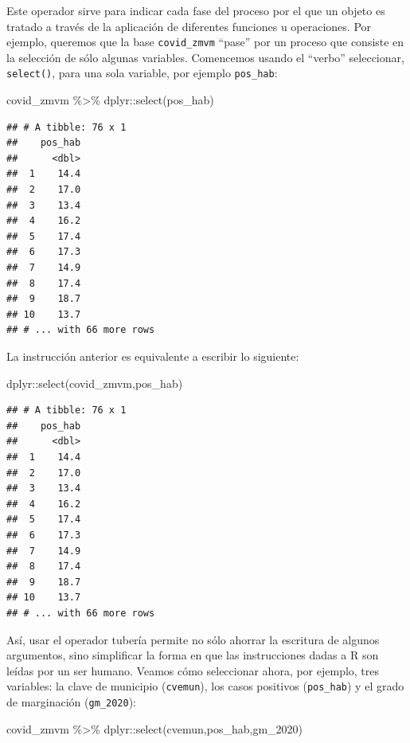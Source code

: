 \documentclass[
  11pt,
  oneside]{book}
\newenvironment{Shaded}{\begin{snugshade}}{\end{snugshade}}
\newcommand{\FunctionTok}[1]{\textcolor[rgb]{0.00,0.00,0.00}{#1}}
\newcommand{\NormalTok}[1]{#1}
\newcommand{\SpecialCharTok}[1]{\textcolor[rgb]{0.00,0.00,0.00}{#1}}
\begin{document}
Este operador sirve para indicar cada fase del proceso por el que un objeto es tratado a través de la aplicación de diferentes funciones u operaciones. Por ejemplo, queremos que la base \texttt{covid\_zmvm} ``pase'' por un proceso que consiste en la selección de sólo algunas variables. Comencemos usando el ``verbo'' seleccionar, \texttt{select()}, para una sola variable, por ejemplo \texttt{pos\_hab}:

\begin{Shaded}
\begin{Highlighting}[]
\NormalTok{covid\_zmvm }\SpecialCharTok{\%\textgreater{}\%}\NormalTok{ dplyr}\SpecialCharTok{::}\FunctionTok{select}\NormalTok{(pos\_hab)}
\end{Highlighting}
\end{Shaded}

\begin{verbatim}
## # A tibble: 76 x 1
##    pos_hab
##      <dbl>
##  1    14.4
##  2    17.0
##  3    13.4
##  4    16.2
##  5    17.4
##  6    17.3
##  7    14.9
##  8    17.4
##  9    18.7
## 10    13.7
## # ... with 66 more rows
\end{verbatim}

La instrucción anterior es equivalente a escribir lo siguiente:

\begin{Shaded}
\begin{Highlighting}[]
\NormalTok{dplyr}\SpecialCharTok{::}\FunctionTok{select}\NormalTok{(covid\_zmvm,pos\_hab)}
\end{Highlighting}
\end{Shaded}

\begin{verbatim}
## # A tibble: 76 x 1
##    pos_hab
##      <dbl>
##  1    14.4
##  2    17.0
##  3    13.4
##  4    16.2
##  5    17.4
##  6    17.3
##  7    14.9
##  8    17.4
##  9    18.7
## 10    13.7
## # ... with 66 more rows
\end{verbatim}

Así, usar el operador tubería permite no sólo ahorrar la escritura de algunos argumentos, sino simplificar la forma en que las instrucciones dadas a R son leídas por un ser humano. Veamos cómo seleccionar ahora, por ejemplo, tres variables: la clave de municipio (\texttt{cvemun}), los casos positivos (\texttt{pos\_hab}) y el grado de marginación (\texttt{gm\_2020}):

\begin{Shaded}
\begin{Highlighting}[]
\NormalTok{covid\_zmvm }\SpecialCharTok{\%\textgreater{}\%}\NormalTok{ dplyr}\SpecialCharTok{::}\FunctionTok{select}\NormalTok{(cvemun,pos\_hab,gm\_2020)}
\end{Highlighting}
\end{Shaded}
\end{document}
